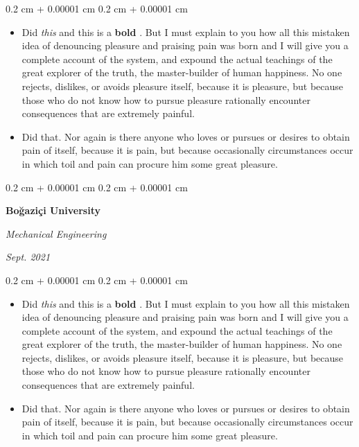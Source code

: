\documentclass[10pt, letterpaper]{article}
\newenvironment{highlights}{
    \begin{itemize}[
        topsep=0.10 cm,
        parsep=0.10 cm,
        partopsep=0pt,
        itemsep=0pt,
        leftmargin=0.4 cm + 10pt
    ]
}{
    \end{itemize}
} %
\newenvironment{onecolentry}{
    \begin{adjustwidth}{
        0.2 cm + 0.00001 cm
    }{
        0.2 cm + 0.00001 cm
    }
}{
    \end{adjustwidth}
} %
\newenvironment{twocolentry}[2][]{
    \onecolentry
    \def\secondColumn{#2}
    \setcolumnwidth{\fill, 4.5 cm}
    \begin{paracol}{2}
}{
    \switchcolumn \raggedleft \secondColumn
    \end{paracol}
    \endonecolentry
} %
\let\hrefWithoutArrow\href
\renewcommand{\href}[2]{\hrefWithoutArrow{#1}{\mbox{\ifthenelse{\equal{#2}{}}{ }{#2 }\raisebox{.15ex}{\footnotesize \faExternalLink*}}}}
\begin{document}
        \vspace{0.10 cm-3px}
        \begin{onecolentry}
            \begin{highlights}
                \item Did \textit{this} and this is a \textbf{bold} \href{https://example.com}{link}. But I must explain to you how all this mistaken idea of denouncing pleasure and praising pain was born and I will give you a complete account of the system, and expound the actual teachings of the great explorer of the truth, the master-builder of human happiness. No one rejects, dislikes, or avoids pleasure itself, because it is pleasure, but because those who do not know how to pursue pleasure rationally encounter consequences that are extremely painful.
                \item Did that. Nor again is there anyone who loves or pursues or desires to obtain pain of itself, because it is pain, but because occasionally circumstances occur in which toil and pain can procure him some great pleasure.
            \end{highlights}
        \end{onecolentry}


        \vspace{0.2 cm-3px}

        \begin{twocolentry}{
            
            
        \textit{Sept. 2021}}
            \textbf{Boğaziçi University}

            \textit{Mechanical Engineering}
        \end{twocolentry}

        \vspace{0.10 cm-3px}
        \begin{onecolentry}
            \begin{highlights}
                \item Did \textit{this} and this is a \textbf{bold} \href{https://example.com}{link}. But I must explain to you how all this mistaken idea of denouncing pleasure and praising pain was born and I will give you a complete account of the system, and expound the actual teachings of the great explorer of the truth, the master-builder of human happiness. No one rejects, dislikes, or avoids pleasure itself, because it is pleasure, but because those who do not know how to pursue pleasure rationally encounter consequences that are extremely painful.
                \item Did that. Nor again is there anyone who loves or pursues or desires to obtain pain of itself, because it is pain, but because occasionally circumstances occur in which toil and pain can procure him some great pleasure.
            \end{highlights}
        \end{onecolentry}
\end{document}
